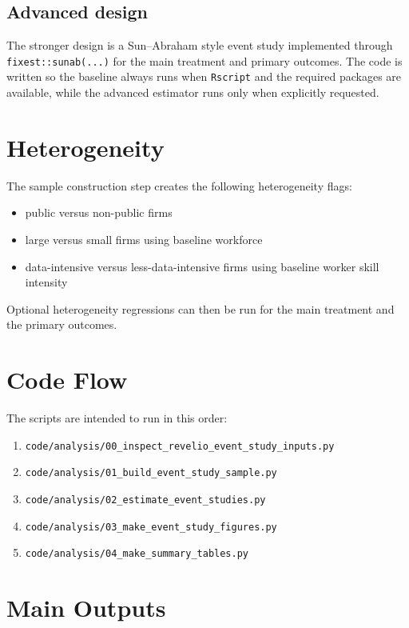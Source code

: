 \documentclass[11pt]{article}
\begin{document}
\subsection*{Advanced design}

The stronger design is a Sun--Abraham style event study implemented through \texttt{fixest::sunab(...)} for the main treatment and primary outcomes. The code is written so the baseline always runs when \texttt{Rscript} and the required packages are available, while the advanced estimator runs only when explicitly requested.

\section{Heterogeneity}

The sample construction step creates the following heterogeneity flags:

\begin{itemize}[leftmargin=1.5em]
    \item public versus non-public firms
    \item large versus small firms using baseline workforce
    \item data-intensive versus less-data-intensive firms using baseline worker skill intensity
\end{itemize}

Optional heterogeneity regressions can then be run for the main treatment and the primary outcomes.

\section{Code Flow}

The scripts are intended to run in this order:

\begin{enumerate}[leftmargin=1.5em]
    \item \texttt{code/analysis/00\_inspect\_revelio\_event\_study\_inputs.py}
    \item \texttt{code/analysis/01\_build\_event\_study\_sample.py}
    \item \texttt{code/analysis/02\_estimate\_event\_studies.py}
    \item \texttt{code/analysis/03\_make\_event\_study\_figures.py}
    \item \texttt{code/analysis/04\_make\_summary\_tables.py}
\end{enumerate}

\section{Main Outputs}
\end{document}
